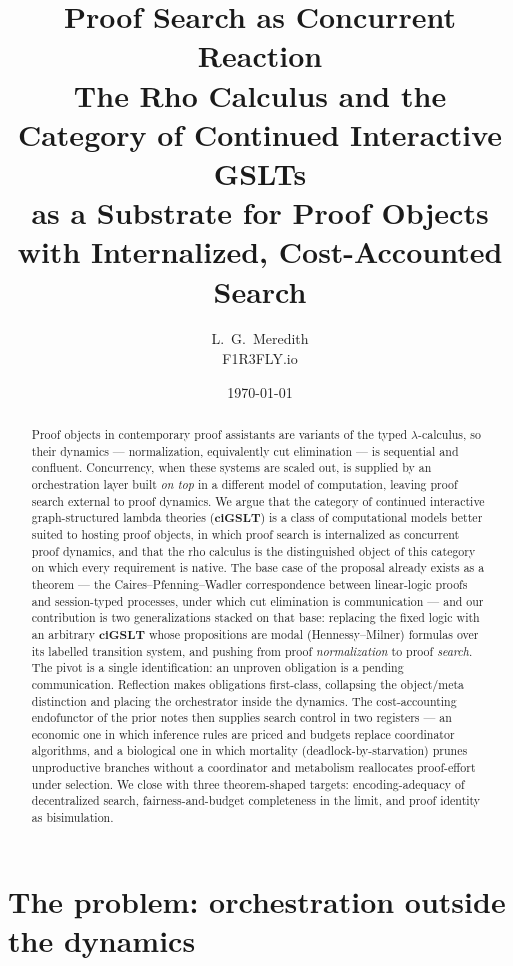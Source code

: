 \documentclass[11pt]{article}
\title{\textbf{Proof Search as Concurrent Reaction}\\[0.35em]
\large The Rho Calculus and the Category of Continued Interactive GSLTs\\
as a Substrate for Proof Objects with Internalized, Cost-Accounted Search}
\author{L.~G.~Meredith\\ \small F1R3FLY.io}
\date{\today}
\theoremstyle{plain}
\theoremstyle{definition}
\theoremstyle{remark}
\newcommand{\ciGSLT}{\mathbf{ciGSLT}}
\begin{document}
\maketitle

\begin{abstract}
Proof objects in contemporary proof assistants are variants of the typed
$\lambda$-calculus, so their dynamics --- normalization, equivalently cut
elimination --- is sequential and confluent. Concurrency, when these systems
are scaled out, is supplied by an orchestration layer built \emph{on top} in a
different model of computation, leaving proof search external to proof
dynamics. We argue that the category of continued interactive graph-structured
lambda theories ($\ciGSLT$) is a class of computational models better suited to
hosting proof objects, in which proof search is internalized as concurrent
proof dynamics, and that the rho calculus is the distinguished object of this
category on which every requirement is native. The base case of the proposal
already exists as a theorem --- the Caires--Pfenning--Wadler correspondence
between linear-logic proofs and session-typed processes, under which cut
elimination is communication --- and our contribution is two generalizations
stacked on that base: replacing the fixed logic with an arbitrary
$\ciGSLT$ whose propositions are modal (Hennessy--Milner) formulas over its
labelled transition system, and pushing from proof \emph{normalization} to
proof \emph{search}. The pivot is a single identification: an unproven
obligation is a pending communication. Reflection makes obligations
first-class, collapsing the object/meta distinction and placing the
orchestrator inside the dynamics. The cost-accounting endofunctor of the prior
notes then supplies search control in two registers --- an economic one in
which inference rules are priced and budgets replace coordinator algorithms,
and a biological one in which mortality (deadlock-by-starvation) prunes
unproductive branches without a coordinator and metabolism reallocates
proof-effort under selection. We close with three theorem-shaped targets:
encoding-adequacy of decentralized search, fairness-and-budget completeness in
the limit, and proof identity as bisimulation.
\end{abstract}

\section{The problem: orchestration outside the dynamics}
\end{document}
